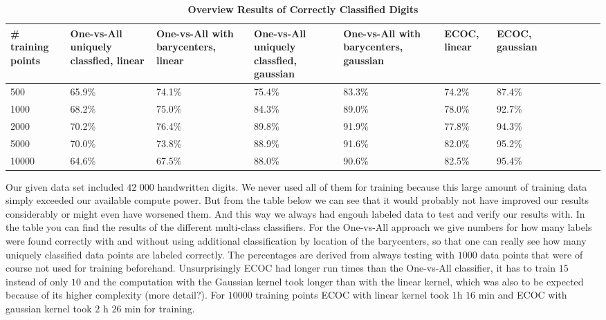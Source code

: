\begin{table}[ht!]
	\centering
	\caption{\textbf{Overview Results of Correctly Classified Digits}}
	\begin{tabular}{|l|l|l|l|l|l|l|l|l|l|l|l|} \hline
		\multicolumn{1}{|p{1.8cm}|}{\vspace*{.7 cm}\# training points} &
		\multicolumn{1}{p{1.8cm}|}{\vspace*{.05 cm}One-vs-All uniquely classfied, linear} &
		\multicolumn{1}{p{1.8cm}|}{\vspace*{.15 cm}One-vs-All with barycenters, linear} &
		\multicolumn{1}{p{1.8cm}|}{\vspace*{.05 cm}One-vs-All uniquely classfied, gaussian} &
		\multicolumn{1}{p{1.8cm}|}{\vspace*{.0 cm}One-vs-All with barycenters, gaussian} &
		\multicolumn{1}{p{1.8cm}|}{\vspace*{.7 cm}ECOC, linear} &
		\multicolumn{1}{p{1.8cm}|}{\vspace*{.7 cm}ECOC, gaussian} \\ \hline \hline
		500	& 65.9\% & 74.1\% & 75.4\% & 83.3\% & 74.2\% & 87.4\% \\ \hline
		1000	& 68.2\% & 75.0\% & 84.3\% & 89.0\% & 78.0\% & 92.7\% \\ \hline
		2000	& 70.2\% & 76.4\% & 89.8\% & 91.9\% & 77.8\% & 94.3\% \\ \hline
		5000	& 70.0\% & 73.8\% & 88.9\% & 91.6\% & 82.0\% & 95.2\% \\ \hline
		10000	& 64.6\% & 67.5\% & 88.0\% & 90.6\% & 82.5\% & 95.4\% \\ \hline
	\end{tabular}
\end{table}

\smallskip
Our given data set included $42$ $000$ handwritten digits. We never used all of them for training because this large amount of training data simply exceeded our available compute power. But from the table below we can see that it would probably not have improved our results considerably or might even have worsened them. And this way we always had engouh labeled data to test and verify our results with. In the table you can find the results of the different multi-class classifiers. For the One-vs-All approach we give numbers for how many labels were found correctly with and without using additional classification by location of the barycenters, so that one can really see how many uniquely classified data points are labeled correctly. The percentages are derived from always testing with $1000$ data points that were of course not used for training beforehand. Unsurprisingly ECOC had longer run times than the One-vs-All classifier, it has to train $15$ instead of only $10$ and the computation with the Gaussian kernel took longer than with the linear kernel, which was also to be expected because of its higher complexity (more detail?). For $10 000$ training points ECOC with linear kernel took $1$h $16$ min and ECOC with gaussian kernel took $2$ h $26$ min for training.  

